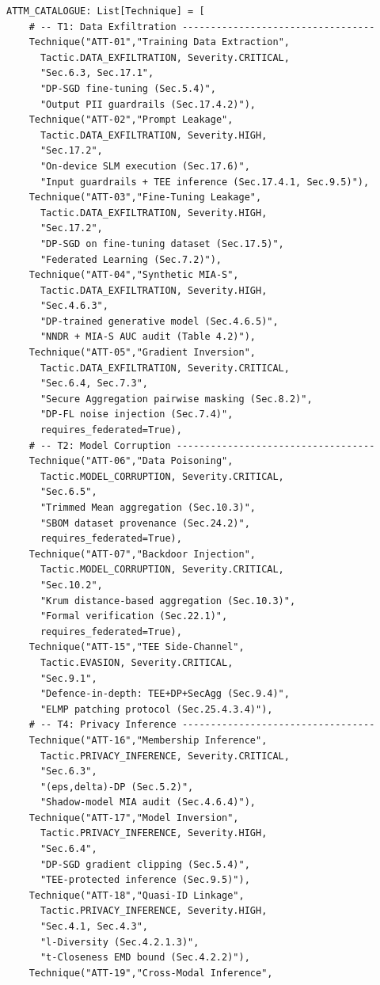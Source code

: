 \begin{lstlisting}
ATTM_CATALOGUE: List[Technique] = [
    # -- T1: Data Exfiltration ----------------------------------
    Technique("ATT-01","Training Data Extraction",
      Tactic.DATA_EXFILTRATION, Severity.CRITICAL,
      "Sec.6.3, Sec.17.1",
      "DP-SGD fine-tuning (Sec.5.4)",
      "Output PII guardrails (Sec.17.4.2)"),
    Technique("ATT-02","Prompt Leakage",
      Tactic.DATA_EXFILTRATION, Severity.HIGH,
      "Sec.17.2",
      "On-device SLM execution (Sec.17.6)",
      "Input guardrails + TEE inference (Sec.17.4.1, Sec.9.5)"),
    Technique("ATT-03","Fine-Tuning Leakage",
      Tactic.DATA_EXFILTRATION, Severity.HIGH,
      "Sec.17.2",
      "DP-SGD on fine-tuning dataset (Sec.17.5)",
      "Federated Learning (Sec.7.2)"),
    Technique("ATT-04","Synthetic MIA-S",
      Tactic.DATA_EXFILTRATION, Severity.HIGH,
      "Sec.4.6.3",
      "DP-trained generative model (Sec.4.6.5)",
      "NNDR + MIA-S AUC audit (Table 4.2)"),
    Technique("ATT-05","Gradient Inversion",
      Tactic.DATA_EXFILTRATION, Severity.CRITICAL,
      "Sec.6.4, Sec.7.3",
      "Secure Aggregation pairwise masking (Sec.8.2)",
      "DP-FL noise injection (Sec.7.4)",
      requires_federated=True),
    # -- T2: Model Corruption -----------------------------------
    Technique("ATT-06","Data Poisoning",
      Tactic.MODEL_CORRUPTION, Severity.CRITICAL,
      "Sec.6.5",
      "Trimmed Mean aggregation (Sec.10.3)",
      "SBOM dataset provenance (Sec.24.2)",
      requires_federated=True),
    Technique("ATT-07","Backdoor Injection",
      Tactic.MODEL_CORRUPTION, Severity.CRITICAL,
      "Sec.10.2",
      "Krum distance-based aggregation (Sec.10.3)",
      "Formal verification (Sec.22.1)",
      requires_federated=True),
    Technique("ATT-15","TEE Side-Channel",
      Tactic.EVASION, Severity.CRITICAL,
      "Sec.9.1",
      "Defence-in-depth: TEE+DP+SecAgg (Sec.9.4)",
      "ELMP patching protocol (Sec.25.4.3.4)"),
    # -- T4: Privacy Inference ----------------------------------
    Technique("ATT-16","Membership Inference",
      Tactic.PRIVACY_INFERENCE, Severity.CRITICAL,
      "Sec.6.3",
      "(eps,delta)-DP (Sec.5.2)",
      "Shadow-model MIA audit (Sec.4.6.4)"),
    Technique("ATT-17","Model Inversion",
      Tactic.PRIVACY_INFERENCE, Severity.HIGH,
      "Sec.6.4",
      "DP-SGD gradient clipping (Sec.5.4)",
      "TEE-protected inference (Sec.9.5)"),
    Technique("ATT-18","Quasi-ID Linkage",
      Tactic.PRIVACY_INFERENCE, Severity.HIGH,
      "Sec.4.1, Sec.4.3",
      "l-Diversity (Sec.4.2.1.3)",
      "t-Closeness EMD bound (Sec.4.2.2)"),
    Technique("ATT-19","Cross-Modal Inference",

\end{lstlisting}

